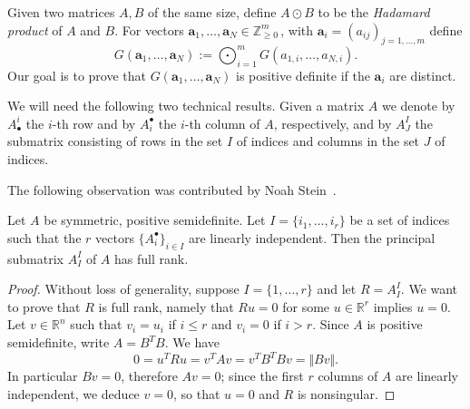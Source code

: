 \documentclass{toc}
\newcommand{\vvirg}{ , \dots , }
\newcommand{\bfa}{\mathbf{a}}
\newcommand{\bbR}{\mathbb{R}}
\newcommand{\bbZ}{\mathbb{Z}}
\begin{document}
Given two matrices $A,B$ of the same size, define $A \odot B$ to be the \emph{Hadamard product} of $A$ and $B$. For vectors $\bfa_1 \vvirg \bfa_N \in \bbZ^{m}_{\geq 0}$\,, with $\bfa_i = (a_{ij}) _{j = 1 \vvirg m}$ define 
\[
 G(\bfa_1 \vvirg \bfa_N) := \bigodot_{i=1}^m G(a_{1,i}\vvirg a_{N,i}).
\]
Our goal is to prove that $G(\bfa_1 \vvirg \bfa_N)$ is positive definite if the  $\bfa_i$ are distinct.

%
We will need the following two technical results.  Given a matrix $A$ we
%
denote by $A^i_\bullet$ the $i$-th row   %
and by $A^\bullet_i$ the $i$-th column of $A$, respectively,  %
%
and by $A^I_J$ the submatrix consisting of rows in the set
%
%
$I$ of indices and columns in the set $J$ of indices.   %

%
The following observation was contributed by Noah Stein~\cite{266847}.
\begin{lemma}[Stein]\label{lemma: principal minor on indep rows}
 Let $A$ be symmetric, positive semidefinite. Let $I = \{ i_1 \vvirg i_r\}$ be a set of indices such that the $r$ vectors $\{ A^\bullet_i\}_{i \in I}$ are linearly independent. Then the principal submatrix $A^I_I$ of $A$ has full rank.
\end{lemma}
\begin{proof}
 Without loss of generality, suppose $I = \{ 1 \vvirg r\}$ and let $R = A^I_I$. We want to prove that $R$ is full rank, namely that $Ru = 0$ for some $u \in \bbR^r$ implies $u =0$. Let $v \in \bbR^n$ such that $v_i = u_i$ if $i\leq r$ and $v_i = 0$ if $i > r$. Since $A$ is positive semidefinite, write $A = B^T B$. We have 
 \[
0 =  u^T R u = v^T A v = v^T B^T B v = \Vert Bv \Vert.
 \]
In particular $Bv = 0$, therefore $Av =0$; since the first $r$ columns of $A$ are linearly independent, we deduce $v = 0$, so that $u =0$ and $R$ is nonsingular.
\end{proof}
\end{document}
